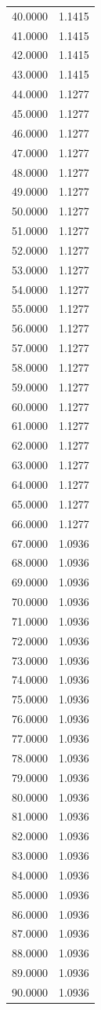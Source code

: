 \documentclass[11pt]{report}
\begin{document}
\begin{longtable}{ll}
40.0000 & 1.1415 \\
41.0000 & 1.1415 \\
42.0000 & 1.1415 \\
43.0000 & 1.1415 \\
44.0000 & 1.1277 \\
45.0000 & 1.1277 \\
46.0000 & 1.1277 \\
47.0000 & 1.1277 \\
48.0000 & 1.1277 \\
49.0000 & 1.1277 \\
50.0000 & 1.1277 \\
51.0000 & 1.1277 \\
52.0000 & 1.1277 \\
53.0000 & 1.1277 \\
54.0000 & 1.1277 \\
55.0000 & 1.1277 \\
56.0000 & 1.1277 \\
57.0000 & 1.1277 \\
58.0000 & 1.1277 \\
59.0000 & 1.1277 \\
60.0000 & 1.1277 \\
61.0000 & 1.1277 \\
62.0000 & 1.1277 \\
63.0000 & 1.1277 \\
64.0000 & 1.1277 \\
65.0000 & 1.1277 \\
66.0000 & 1.1277 \\
67.0000 & 1.0936 \\
68.0000 & 1.0936 \\
69.0000 & 1.0936 \\
70.0000 & 1.0936 \\
71.0000 & 1.0936 \\
72.0000 & 1.0936 \\
73.0000 & 1.0936 \\
74.0000 & 1.0936 \\
75.0000 & 1.0936 \\
76.0000 & 1.0936 \\
77.0000 & 1.0936 \\
78.0000 & 1.0936 \\
79.0000 & 1.0936 \\
80.0000 & 1.0936 \\
81.0000 & 1.0936 \\
82.0000 & 1.0936 \\
83.0000 & 1.0936 \\
84.0000 & 1.0936 \\
85.0000 & 1.0936 \\
86.0000 & 1.0936 \\
87.0000 & 1.0936 \\
88.0000 & 1.0936 \\
89.0000 & 1.0936 \\
90.0000 & 1.0936 \\
\bottomrule
\end{longtable}
\end{document}
